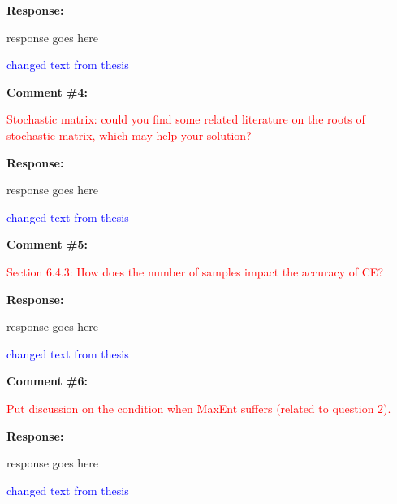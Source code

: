\documentclass[journal]{IEEEtran}
\begin{document}
\vspace{10pt}
\textbf{Response:}
\begin{adjustwidth}{2.5em}{0pt}
response goes here

\vspace{10pt}
\noindent\textcolor{blue}{changed text from thesis}
\end{adjustwidth}


\vspace{30pt}
\textbf{Comment \#4:}
\begin{adjustwidth}{2.5em}{0pt}
\singlespacing \vspace{-10pt}
\textcolor{red}{Stochastic matrix: could you find some related literature on the roots of stochastic matrix, which may help your solution?}
\end{adjustwidth}

\vspace{10pt}
\textbf{Response:}
\begin{adjustwidth}{2.5em}{0pt}
response goes here

\vspace{10pt}
\noindent\textcolor{blue}{changed text from thesis}
\end{adjustwidth}


\vspace{30pt}
\textbf{Comment \#5:}
\begin{adjustwidth}{2.5em}{0pt}
\singlespacing \vspace{-10pt}
\textcolor{red}{Section 6.4.3: How does the number of samples impact the accuracy of CE?}
\end{adjustwidth}

\vspace{10pt}
\textbf{Response:}
\begin{adjustwidth}{2.5em}{0pt}
response goes here

\vspace{10pt}
\noindent\textcolor{blue}{changed text from thesis}
\end{adjustwidth}


\vspace{30pt}
\textbf{Comment \#6:}
\begin{adjustwidth}{2.5em}{0pt}
\singlespacing \vspace{-10pt}
\textcolor{red}{Put discussion on the condition when MaxEnt suffers (related to question 2).}
\end{adjustwidth}

\vspace{10pt}
\textbf{Response:}
\begin{adjustwidth}{2.5em}{0pt}
response goes here

\vspace{10pt}
\noindent\textcolor{blue}{changed text from thesis}
\end{adjustwidth}
\end{document}
